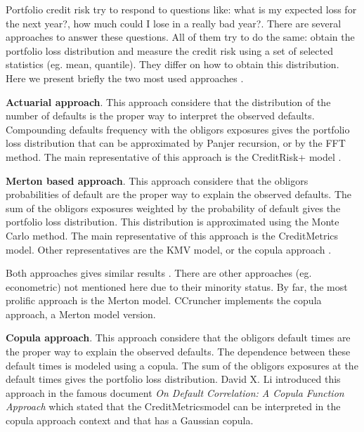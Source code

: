 \documentclass[11pt,fleqn]{book} %
\begin{document}
Portfolio credit risk try to respond to questions like: what is my 
expected loss for the next year?, how much could I lose in a really 
bad year?. There are several approaches to answer these questions. 
All of them try to do the same: obtain the portfolio loss distribution
and measure the credit risk using a set of selected statistics (eg. mean, 
quantile). They differ on how to obtain this distribution. Here we present 
briefly the two most used approaches \cite{crouhy:2000} 
\cite[chap. 2.4]{bluhm:2002}.

\textbf{Actuarial approach}. This approach considere that the distribution of 
the number of defaults is the proper way to interpret the observed defaults.
Compounding defaults frequency with the obligors exposures gives the portfolio 
loss distribution that can be approximated by Panjer recursion, 
or by the FFT method. The main representative of this approach is the 
CreditRisk+ model \cite{creditrisk+:1997}.

\textbf{Merton based approach}. This approach considere that the obligors 
probabilities of default are the proper way to explain the observed defaults.
The sum of the obligors exposures weighted by the probability of default 
gives the portfolio loss distribution. This distribution is approximated 
using the Monte Carlo method. The main representative of this approach is the 
CreditMetrics\texttrademark{} \cite{cmetrics:1997} 
model. Other representatives are the KMV model, or the copula 
approach  \cite{li:2000}.

Both approaches gives similar results \cite{koyluoglu:1998}.  
There are other approaches (eg. econometric) not mentioned here due to 
their minority status. By far, the most prolific approach is the Merton
model. CCruncher implements the copula approach, a Merton model version.

\textbf{Copula approach}. This approach considere that the obligors default 
times are the proper way to explain the observed defaults. The dependence 
between these default times is modeled using a copula. The sum of the 
obligors exposures at the default times gives the portfolio loss distribution.
David X. Li introduced this approach in the famous document
\emph{On Default Correlation: A Copula Function Approach} \cite{li:2000}
which stated that the CreditMetrics\texttrademark model can be interpreted 
in the copula approach context and that has a Gaussian copula.
\end{document}
